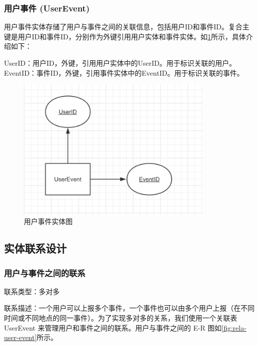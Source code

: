 \subsubsection{用户事件 (UserEvent)}

用户事件实体存储了用户与事件之间的关联信息，包括用户ID和事件ID。复合主键是用户ID和事件ID，分别作为外键引用用户实体和事件实体。如\cref{fig:entity-userevent}所示，具体介绍如下：

UserID：用户ID，外键，引用用户实体中的UserID。用于标识关联的用户。
EventID：事件ID，外键，引用事件实体中的EventID。用于标识关联的事件。

\begin{figure}[htbp]
    \centering
    \includegraphics[width=0.85\textwidth]{figures/db-img-05.png}
    \caption{用户事件实体图}
    \label{fig:entity-userevent}
\end{figure}

\subsection{实体联系设计}

\subsubsection{用户与事件之间的联系}

联系类型：多对多

联系描述：一个用户可以上报多个事件，一个事件也可以由多个用户上报（在不同时间或不同地点的同一事件）。为了实现多对多的关系，我们使用一个关联表 UserEvent 来管理用户和事件之间的联系。用户与事件之间的 E-R 图如\cref{fig:rela-user-event}所示。

